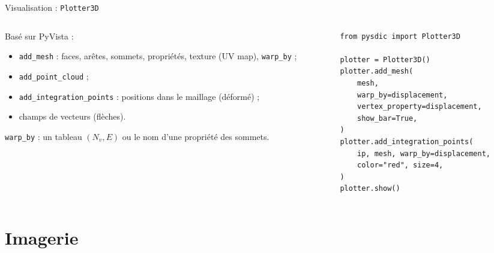 \documentclass[aspectratio=169,11pt]{beamer}
\newcommand{\code}[1]{\texttt{\small #1}}
\begin{document}
\begin{frame}[fragile]{Visualisation : \texttt{Plotter3D}}
  \begin{columns}[T]
    \begin{column}{0.42\textwidth}
      Basé sur PyVista :
      \begin{itemize}\small
        \item \code{add\_mesh} : faces, arêtes, sommets, propriétés,
              texture (UV map), \code{warp\_by} ;
        \item \code{add\_point\_cloud} ;
        \item \code{add\_integration\_points} : positions dans le maillage
              (déformé) ;
        \item champs de vecteurs (flèches).
      \end{itemize}
      \medskip
      \small \code{warp\_by} : un tableau $(N_v, E)$ ou le nom d'une propriété
      des sommets.
    \end{column}
    \begin{column}{0.56\textwidth}
\begin{lstlisting}
from pysdic import Plotter3D
 
plotter = Plotter3D()
plotter.add_mesh(
    mesh,
    warp_by=displacement,
    vertex_property=displacement,
    show_bar=True,
)
plotter.add_integration_points(
    ip, mesh, warp_by=displacement,
    color="red", size=4,
)
plotter.show()
\end{lstlisting}
    \end{column}
  \end{columns}
\end{frame}
 
 
\section{Imagerie}
 
\end{document}
